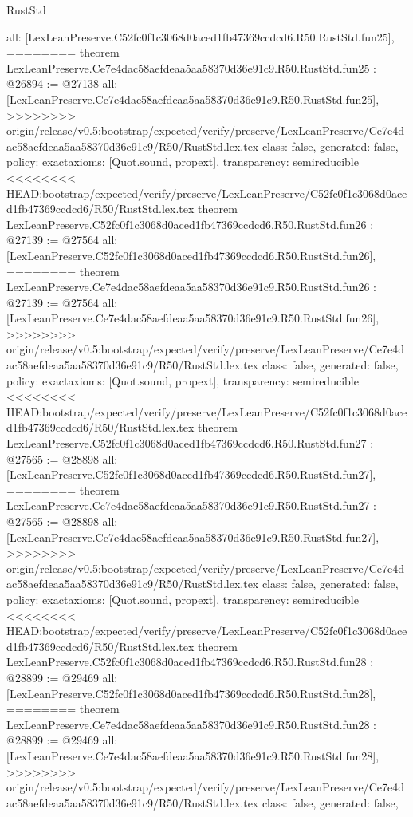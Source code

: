 \begin{lexlean}{RustStd}
\begin{coremodule}
{\begin{coremodule}
{{{{{{{{{{{{{{{{{{{{{{{{{{{{  all: [LexLeanPreserve.C52fc0f1c3068d0aced1fb47369ccdcd6.R50.RustStd.fun25],
========
theorem LexLeanPreserve.Ce7e4dac58aefdeaa5aa58370d36e91c9.R50.RustStd.fun25 : @26894 := @27138 {
  all: [LexLeanPreserve.Ce7e4dac58aefdeaa5aa58370d36e91c9.R50.RustStd.fun25],
>>>>>>>> origin/release/v0.5:bootstrap/expected/verify/preserve/LexLeanPreserve/Ce7e4dac58aefdeaa5aa58370d36e91c9/R50/RustStd.lex.tex
  class: false,
  generated: false,
  policy: exact{axioms: [Quot.sound, propext]},
  transparency: semireducible
}
<<<<<<<< HEAD:bootstrap/expected/verify/preserve/LexLeanPreserve/C52fc0f1c3068d0aced1fb47369ccdcd6/R50/RustStd.lex.tex
theorem LexLeanPreserve.C52fc0f1c3068d0aced1fb47369ccdcd6.R50.RustStd.fun26 : @27139 := @27564 {
  all: [LexLeanPreserve.C52fc0f1c3068d0aced1fb47369ccdcd6.R50.RustStd.fun26],
========
theorem LexLeanPreserve.Ce7e4dac58aefdeaa5aa58370d36e91c9.R50.RustStd.fun26 : @27139 := @27564 {
  all: [LexLeanPreserve.Ce7e4dac58aefdeaa5aa58370d36e91c9.R50.RustStd.fun26],
>>>>>>>> origin/release/v0.5:bootstrap/expected/verify/preserve/LexLeanPreserve/Ce7e4dac58aefdeaa5aa58370d36e91c9/R50/RustStd.lex.tex
  class: false,
  generated: false,
  policy: exact{axioms: [Quot.sound, propext]},
  transparency: semireducible
}
<<<<<<<< HEAD:bootstrap/expected/verify/preserve/LexLeanPreserve/C52fc0f1c3068d0aced1fb47369ccdcd6/R50/RustStd.lex.tex
theorem LexLeanPreserve.C52fc0f1c3068d0aced1fb47369ccdcd6.R50.RustStd.fun27 : @27565 := @28898 {
  all: [LexLeanPreserve.C52fc0f1c3068d0aced1fb47369ccdcd6.R50.RustStd.fun27],
========
theorem LexLeanPreserve.Ce7e4dac58aefdeaa5aa58370d36e91c9.R50.RustStd.fun27 : @27565 := @28898 {
  all: [LexLeanPreserve.Ce7e4dac58aefdeaa5aa58370d36e91c9.R50.RustStd.fun27],
>>>>>>>> origin/release/v0.5:bootstrap/expected/verify/preserve/LexLeanPreserve/Ce7e4dac58aefdeaa5aa58370d36e91c9/R50/RustStd.lex.tex
  class: false,
  generated: false,
  policy: exact{axioms: [Quot.sound, propext]},
  transparency: semireducible
}
<<<<<<<< HEAD:bootstrap/expected/verify/preserve/LexLeanPreserve/C52fc0f1c3068d0aced1fb47369ccdcd6/R50/RustStd.lex.tex
theorem LexLeanPreserve.C52fc0f1c3068d0aced1fb47369ccdcd6.R50.RustStd.fun28 : @28899 := @29469 {
  all: [LexLeanPreserve.C52fc0f1c3068d0aced1fb47369ccdcd6.R50.RustStd.fun28],
========
theorem LexLeanPreserve.Ce7e4dac58aefdeaa5aa58370d36e91c9.R50.RustStd.fun28 : @28899 := @29469 {
  all: [LexLeanPreserve.Ce7e4dac58aefdeaa5aa58370d36e91c9.R50.RustStd.fun28],
>>>>>>>> origin/release/v0.5:bootstrap/expected/verify/preserve/LexLeanPreserve/Ce7e4dac58aefdeaa5aa58370d36e91c9/R50/RustStd.lex.tex
  class: false,
  generated: false,
}}}}}}}}}}}}}}}}}}}}}}}}}}}}}}}}
\end{coremodule}}
\end{coremodule}
\end{lexlean}
